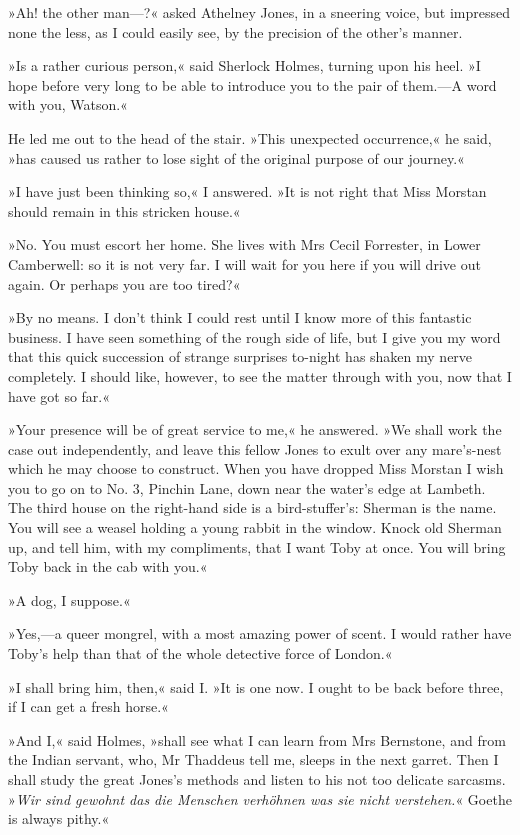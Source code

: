 »Ah! the other man—?« asked Athelney Jones, in a sneering voice, but impressed none the less, as I could easily see, by the precision of the other's manner.

»Is a rather curious person,« said Sherlock Holmes, turning upon his heel. »I hope before very long to be able to introduce you to the pair of them.—A word with you, Watson.«

He led me out to the head of the stair. »This unexpected occurrence,« he said, »has caused us rather to lose sight of the original purpose of our journey.«

»I have just been thinking so,« I answered. »It is not right that Miss Morstan should remain in this stricken house.«

»No. You must escort her home. She lives with Mrs Cecil Forrester, in Lower Camberwell: so it is not very far. I will wait for you here if you will drive out again. Or perhaps you are too tired?«

»By no means. I don't think I could rest until I know more of this fantastic business. I have seen something of the rough side of life, but I give you my word that this quick succession of strange surprises to-night has shaken my nerve completely. I should like, however, to see the matter through with you, now that I have got so far.«

»Your presence will be of great service to me,« he answered. »We shall work the case out independently, and leave this fellow Jones to exult over any mare's-nest which he may choose to construct. When you have dropped Miss Morstan I wish you to go on to No. 3, Pinchin Lane, down near the water's edge at Lambeth. The third house on the right-hand side is a bird-stuffer's: Sherman is the name. You will see a weasel holding a young rabbit in the window. Knock old Sherman up, and tell him, with my compliments, that I want Toby at once. You will bring Toby back in the cab with you.«

»A dog, I suppose.«

»Yes,—a queer mongrel, with a most amazing power of scent. I would rather have Toby's help than that of the whole detective force of London.«

»I shall bring him, then,« said I. »It is one now. I ought to be back before three, if I can get a fresh horse.«

»And I,« said Holmes, »shall see what I can learn from Mrs Bernstone, and from the Indian servant, who, Mr Thaddeus tell me, sleeps in the next garret. Then I shall study the great Jones's methods and listen to his not too delicate sarcasms. »\textit{\textgerman{Wir sind gewohnt das die Menschen verhöhnen was sie nicht verstehen.}}« Goethe is always pithy.«
